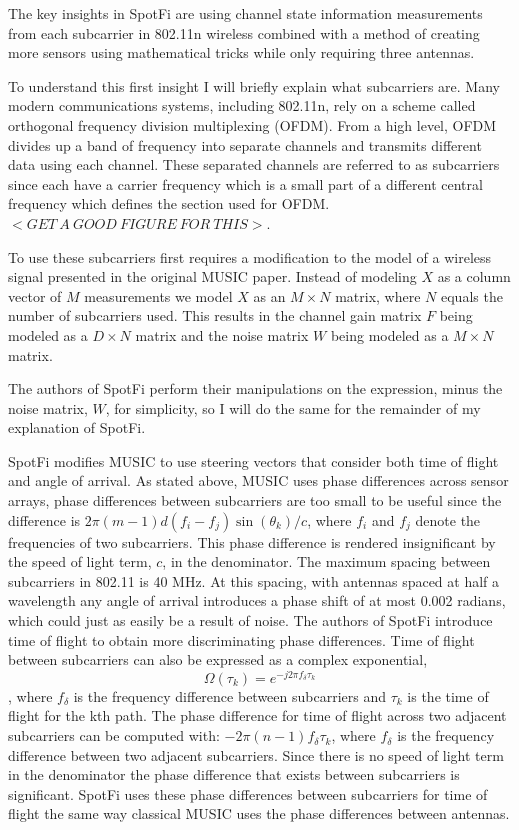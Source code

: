 \documentclass[12pt]{report}
\begin{document}
The key insights in SpotFi are using channel state information measurements from each subcarrier in 802.11n wireless combined with a method of creating more sensors using mathematical tricks while only requiring three antennas. \par

To understand this first insight I will briefly explain what subcarriers are. Many modern communications systems, including 802.11n, rely on a scheme called orthogonal frequency division multiplexing (OFDM). From a high level, OFDM divides up a band of frequency into separate channels and transmits different data using each channel. These separated channels are referred to as subcarriers since each have a carrier frequency which is a small part of a different central frequency which defines the section used for OFDM.  $<GET \: A \: GOOD \: FIGURE \: FOR \: THIS>$. \par

To use these subcarriers first requires a modification to the model of a wireless signal presented in the original MUSIC paper. Instead of modeling $X$ as a column vector of $M$ measurements we model $X$ as an $M \times N$ matrix, where $N$ equals the number of subcarriers used. This results in the channel gain matrix $F$ being modeled as a $D \times N$ matrix and the noise matrix $W$ being modeled as a $M \times N$ matrix. \par

The authors of SpotFi perform their manipulations on the expression, minus the noise matrix, $W$, for simplicity, so I will do the same for the remainder of my explanation of SpotFi. \par

SpotFi modifies MUSIC to use steering vectors that consider both time of flight and angle of arrival. As stated above, MUSIC uses phase differences across sensor arrays, phase differences between subcarriers are too small to be useful since the difference is $2 \pi (m - 1) d (f_i - f_j) \sin(\theta_k) / c$, where $f_i$ and $f_j$ denote the frequencies of two subcarriers. This phase difference is rendered insignificant by the speed of light term, $c$, in the denominator. The maximum spacing between subcarriers in 802.11 is 40 MHz. At this spacing, with antennas spaced at half a wavelength any angle of arrival introduces a phase shift of at most 0.002 radians, which could just as easily be a result of noise. The authors of SpotFi introduce time of flight to obtain more discriminating phase differences. Time of flight between subcarriers can also be expressed as a complex exponential, $$\Omega(\tau_{k}) = e^{-j 2 \pi f_{\delta} \tau_k }$$, where $f_{\delta}$ is the frequency difference between subcarriers and $\tau_{k}$ is the time of flight for the kth path. The phase difference for time of flight across two adjacent subcarriers can be computed with: $-2 \pi (n - 1) f_{\delta} \tau_k$, where $f_{\delta}$ is the frequency difference between two adjacent subcarriers. Since there is no speed of light term in the denominator the phase difference that exists between subcarriers is significant. SpotFi uses these phase differences between subcarriers for time of flight the same way classical MUSIC uses the phase differences between antennas. \par
\end{document}
